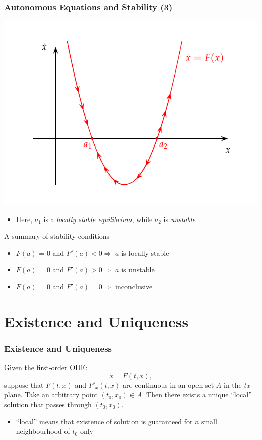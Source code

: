 \documentclass[10pt,usenames,dvipsnames]{beamer}
\theoremstyle{definition}
\begin{document}
\begin{frame}[fragile]
\frametitle{Autonomous Equations and Stability (3)}
\begin{center}
	\includegraphics[scale=0.5]{graphs/phase2}
\end{center}
\begin{itemize}
	\item Here, $a_{1}$ is a \textit{locally stable equilibrium}, while $a_{2}$ is \textit{unstable}
\end{itemize}
\begin{block}{A summary of stability conditions}
\begin{itemize}
	\item $F(a)$ = 0 and $F'(a) < 0 \Rightarrow$ $a$ is locally stable
	\item $F(a)$ = 0 and $F'(a) > 0 \Rightarrow$ $a$ is unstable
	\item $F(a)$ = 0 and $F'(a) = 0 \Rightarrow$ inconclusive
\end{itemize}\end{block}
\end{frame}

\section{Existence and Uniqueness}
\begin{frame}[fragile]
\frametitle{Existence and Uniqueness}
\begin{theorem}
	Given the first-order ODE:
	\[
		\dot{x} = F(t,x),
	\]
	suppose that $F(t,x)$ and $F'_{x}(t,x)$ are continuous in an open set $A$ in the $tx$-plane. Take an arbitrary point $(t_{0},x_{0}) \in A$. Then there exists a unique ``local'' solution that passes through $(t_{0},x_{0})$.
\end{theorem}
\begin{itemize}
	\item ``local'' means that existence of solution is guaranteed for a small neighbourhood of $t_{0}$ only
\end{itemize}
\end{frame}
\end{document}
